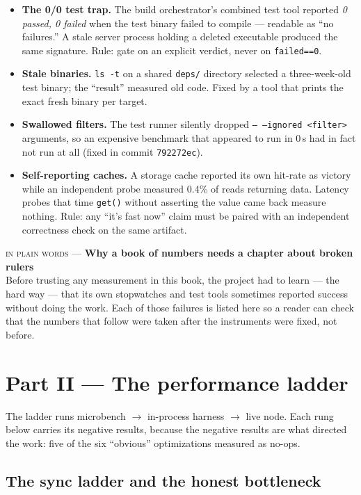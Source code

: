 \documentclass[10pt,a4paper]{article}
\newcommand{\layman}[3]{%
\begin{tcolorbox}[enhanced,
  interior style={left color=#1!9,right color=white},
  colframe=#1!45!slate,boxrule=0.5pt,arc=3pt,
  borderline west={2.5pt}{0pt}{#1},
  left=9pt,right=9pt,top=7pt,bottom=7pt]
{\scriptsize\textcolor{#1}{\textsc{in plain words}}\; — \;\textbf{\small #2}}\\[3pt]
\small #3
\end{tcolorbox}}
\begin{document}
\begin{itemize}[leftmargin=1.4em,itemsep=2pt]
\item \textbf{The 0/0 test trap.} The build orchestrator's combined test tool reported
  \emph{0 passed, 0 failed} when the test binary failed to compile --- readable as ``no
  failures.'' A stale server process holding a deleted executable produced the same
  signature. Rule: gate on an explicit verdict, never on \texttt{failed==0}.
\item \textbf{Stale binaries.} \texttt{ls -t} on a shared \texttt{deps/} directory
  selected a three-week-old test binary; the ``result'' measured old code. Fixed by a
  tool that prints the exact fresh binary per target.
\item \textbf{Swallowed filters.} The test runner silently dropped
  \texttt{--\,--ignored <filter>} arguments, so an expensive benchmark that appeared to
  run in 0\,s had in fact not run at all (fixed in commit \texttt{792272ec}).
\item \textbf{Self-reporting caches.} A storage cache reported its own hit-rate as
  victory while an independent probe measured 0.4\% of reads returning data. Latency
  probes that time \texttt{get()} without asserting the value came back measure nothing.
  Rule: any ``it's fast now'' claim must be paired with an independent correctness check
  on the same artifact.
\end{itemize}

\layman{sigilcyan}{Why a book of numbers needs a chapter about broken rulers}{
Before trusting any measurement in this book, the project had to learn --- the hard way ---
that its own stopwatches and test tools sometimes reported success without doing the work.
Each of those failures is listed here so a reader can check that the numbers that follow
were taken after the instruments were fixed, not before.}

\section{Part II --- The performance ladder}
\label{sec:ladder}

\noindent The ladder runs microbench $\to$ in-process harness $\to$ live node. Each rung
below carries its negative results, because the negative results are what directed the
work: five of the six ``obvious'' optimizations measured as no-ops.

\subsection{The sync ladder and the honest bottleneck}
\label{sec:sync}
\end{document}
